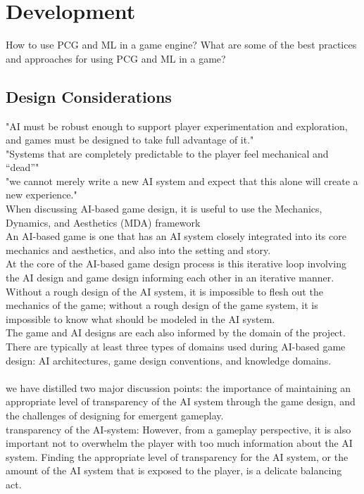 \documentclass[MGS,Master,english]{twbook}%
\begin{document}
\section{Development}
How to use PCG and ML in a game engine? What are some of the best practices and approaches for using PCG and ML in a game?

\subsection{Design Considerations}
"AI must be robust enough to support player experimentation and exploration, and games must be designed to take full advantage of it." \cite{ai::gameDesign}\\
"Systems that are completely predictable to the player feel mechanical and “dead”" \cite{ai::gameDesign}\\
"we cannot merely write a new AI system and expect that this alone will create a new experience." \cite{ai::gameDesign}\\
When discussing AI-based game design, it is useful to use the Mechanics, Dynamics, and Aesthetics (MDA) framework \cite{ai::gameDesign}\\
An AI-based game is one that has an AI system closely integrated into its core mechanics and aesthetics, and also into the setting and story. \cite{ai::gameDesign}\\
At the core of the AI-based game design process is this iterative loop involving the AI design and game design informing each other in an iterative manner. \cite{ai::gameDesign}\\
Without a rough design of the AI system, it is impossible to flesh out the mechanics of the game; without a rough design of the game system, it is impossible to know what should be modeled in the AI system. \cite{ai::gameDesign}\\
The game and AI designs are each also informed by the domain of the project. There are typically at least three types of domains used during AI-based game design: AI architectures, game design conventions, and knowledge domains. \cite{ai::gameDesign}\\
\\
we have distilled two major discussion points: the importance of maintaining an appropriate level of transparency of the AI system through the game design, and the challenges of designing for emergent gameplay.\cite{ai::gameDesign}\\
transparency of the AI-system: However, from a gameplay perspective, it is also important not to overwhelm the player with too much information about the AI system. Finding the appropriate level of transparency for the AI system, or the amount of the AI system that is exposed to the player, is a delicate balancing act.\cite{ai::gameDesign}\\
\end{document}
